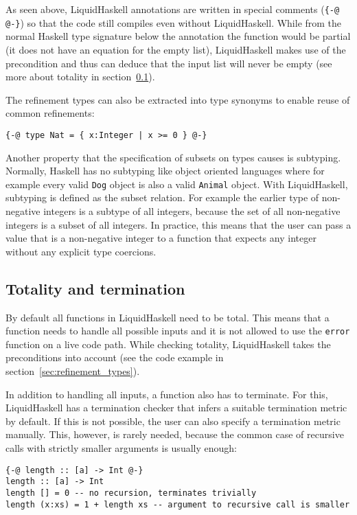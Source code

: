\documentclass[acmlarge,screen,authorversion=true,nonacm=true]{acmart}
\begin{document}
As seen above, LiquidHaskell annotations are written in special comments (\texttt{\{-@ @-\}}) so that the code still compiles even without LiquidHaskell. While from the normal Haskell type signature below the annotation the function would be partial (it does not have an equation for the empty list), LiquidHaskell makes use of the precondition and thus can deduce that the input list will never be empty (see more about totality in section~\ref{sec:totality}).

The refinement types can also be extracted into type synonyms to enable reuse of common refinements:

\begin{lstlisting}
{-@ type Nat = { x:Integer | x >= 0 } @-}
\end{lstlisting}

Another property that the specification of subsets on types causes is subtyping. Normally, Haskell has no subtyping like object oriented languages where for example every valid \texttt{Dog} object is also a valid \texttt{Animal} object. With LiquidHaskell, subtyping is defined as the subset relation. For example the earlier type of non-negative integers is a subtype of all integers, because the set of all non-negative integers is a subset of all integers. In practice, this means that the user can pass a value that is a non-negative integer to a function that expects any integer without any explicit type coercions.

\subsection{Totality and termination}\label{sec:totality}

By default all functions in LiquidHaskell need to be total. This means that a function needs to handle all possible inputs and it is not allowed to use the \texttt{error} function on a live code path. While checking totality, LiquidHaskell takes the preconditions into account (see the code example in section~\ref{sec:refinement_types}).

In addition to handling all inputs, a function also has to terminate. For this, LiquidHaskell has a termination checker that infers a suitable termination metric by default. If this is not possible, the user can also specify a termination metric manually. This, however, is rarely needed, because the common case of recursive calls with strictly smaller arguments is usually enough:

\begin{lstlisting}
{-@ length :: [a] -> Int @-}
length :: [a] -> Int
length [] = 0 -- no recursion, terminates trivially
length (x:xs) = 1 + length xs -- argument to recursive call is smaller
\end{lstlisting}
\end{document}
